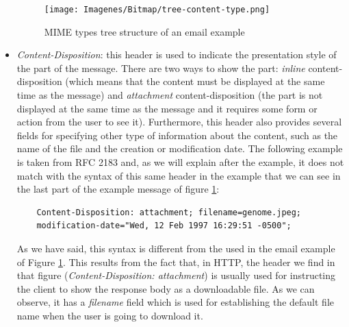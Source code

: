 \begin{itemize}
	\begin{figure}[t]
		\centering%
		\texttt{[image: Imagenes/Bitmap/tree-content-type.png]}%
		\caption{MIME types tree structure of an email example}%
		\label{fig:content-type}
	\end{figure}
	\item\textit{Content-Disposition}: this header is used to indicate the presentation style of the part of the message. There are two ways to show the part: \textit{inline} content-disposition (which means that the content must be displayed at the same time as the message) and \textit{attachment} content-disposition (the part is not displayed at the same time as the message and it requires some form or action from the user to see it). Furthermore, this header also provides several fields for specifying other type of information about the content, such as the name of the file and the creation or modification date. The following example is taken from RFC 2183 \citep{rfc2183} and, as we will explain after the example, it does not match with the syntax of this same header in the example that we can see in the last part of the example message of figure \ref{fig:content-type}:
	\begin{lstlisting}
	Content-Disposition: attachment; filename=genome.jpeg;
	modification-date="Wed, 12 Feb 1997 16:29:51 -0500";
	\end{lstlisting}
	As we have said, this syntax is different from the used in the email example of Figure \ref{fig:content-type}. This results from the fact that, in HTTP, the header we find in that figure (\textit{Content-Disposition: attachment}) is usually used for instructing the client to show the response body as a downloadable file. As we can observe, it has a \textit{filename} field which is used for establishing the default file name when the user is going to download it.
	

\end{itemize}
